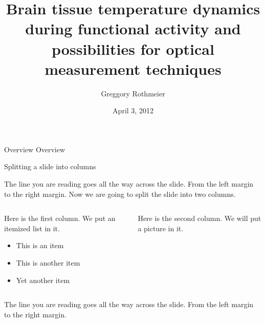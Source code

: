 \documentclass{beamer}
\title{Brain tissue temperature dynamics during functional activity and possibilities for optical measurement techniques}
\author{Greggory Rothmeier}
\institute{
  Department of Physics and Astronomy\\
  Georgia State University\\
  Atlanta, GA 30303\\
}
\date{April 3, 2012}
\begin{document}
  
{
\begin{frame}[plain]
\titlepage
\end{frame} 
}

\begin{frame}{Overview}
  Overview
\end{frame} 

\begin{frame}{Splitting a slide into columns}

The line you are reading goes all the way across the slide.
From the left margin to the right margin.  Now we are going
to split the slide into two columns.
\bigskip

\begin{columns}
  \begin{column}{0.5\textwidth}
    Here is the first column.  We put an itemized list in it.
    \begin{itemize}
      \item This is an item
      \item This is another item
      \item Yet another item
    \end{itemize}
  \end{column}

  \begin{column}{0.3\textwidth}
    Here is the second column.  We will put a picture in it.
  \end{column}
\end{columns}
\bigskip

The line you are reading goes all the way across the slide.
From the left margin to the right margin.

\end{frame}
\end{document}
